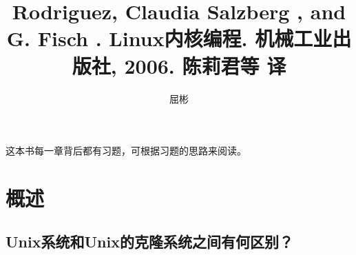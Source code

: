 \documentclass{article}
\begin{document}
	\title{Rodriguez, Claudia Salzberg , and G. Fisch . Linux内核编程. 机械工业出版社, 2006. 陈莉君等 译}
	\author{屈彬}
	\maketitle
	
	这本书每一章背后都有习题，可根据习题的思路来阅读。
	\section{概述}
		\subsection{Unix系统和Unix的克隆系统之间有何区别？}
			
\end{document}
